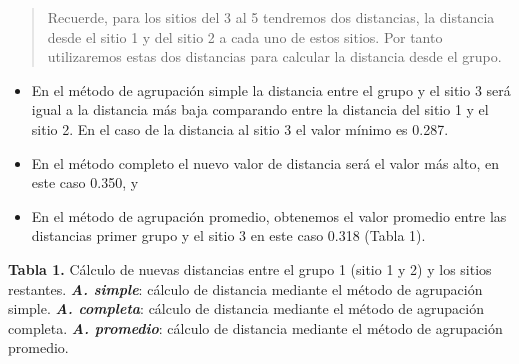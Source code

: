 \documentclass[]{book}
\providecommand{\tightlist}{%
  \setlength{\itemsep}{0pt}\setlength{\parskip}{0pt}}
\begin{document}
\begin{quote}
Recuerde, para los sitios del 3 al 5 tendremos dos distancias, la
distancia desde el sitio 1 y del sitio 2 a cada uno de estos sitios. Por
tanto utilizaremos estas dos distancias para calcular la distancia desde
el grupo.
\end{quote}

\begin{itemize}
\tightlist
\item
  En el método de agrupación simple la distancia entre el grupo y el
  sitio 3 será igual a la distancia más baja comparando entre la
  distancia del sitio 1 y el sitio 2. En el caso de la distancia al
  sitio 3 el valor mínimo es 0.287.\\
\item
  En el método completo el nuevo valor de distancia será el valor más
  alto, en este caso 0.350, y
\item
  En el método de agrupación promedio, obtenemos el valor promedio entre
  las distancias primer grupo y el sitio 3 en este caso 0.318 (Tabla 1).
\end{itemize}

\textbf{Tabla 1.} Cálculo de nuevas distancias entre el grupo 1 (sitio 1
y 2) y los sitios restantes. \emph{\textbf{A. simple}}: cálculo de
distancia mediante el método de agrupación simple. \textbf{\emph{A.
completa}}: cálculo de distancia mediante el método de agrupación
completa. \textbf{\emph{A. promedio}}: cálculo de distancia mediante el
método de agrupación promedio.
\end{document}
